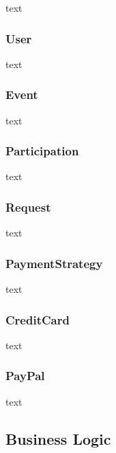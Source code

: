 \documentclass[11pt]{article}
\begin{document}
            text

            \subsubsection{User} \label{subsubsec:user}

                text

            \subsubsection{Event} \label{subsubsec:event}

                text

            \subsubsection{Participation} \label{subsubsec:participation}

                text

            \subsubsection{Request} \label{subsubsec:request}

                text

            \subsubsection{PaymentStrategy} \label{subsubsec:pament-strategy}

                text

            \subsubsection{CreditCard} \label{subsubsec:credit-card}

                text

            \subsubsection{PayPal} \label{subsubsec:paypal}

                text

        \subsection{Business Logic} \label{subsec:business-logic}
\end{document}
